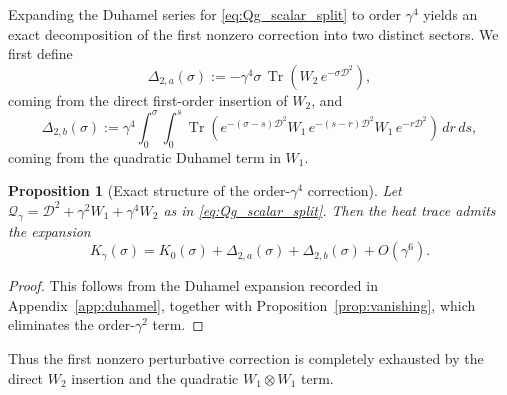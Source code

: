 \documentclass[11pt,a4paper]{article}
\numberwithin{equation}{section}
\newtheorem{Proposition}[Theorem]{Proposition}
\theoremstyle{definition}
\newcommand{\cD}{\mathcal{D}}
\newcommand{\Qg}{\mathcal{Q}_\gamma}
\newcommand{\Tr}{\operatorname{Tr}}
\begin{document}
Expanding the Duhamel series for \eqref{eq:Qg_scalar_split} to order
$\gamma^4$ yields an exact decomposition of the first nonzero correction
into two distinct sectors. We first define
\begin{equation}
\Delta_{2,a}(\sigma):=-\gamma^4\sigma\,\Tr(W_2\,e^{-\sigma\cD^2}),
\label{eq:Delta2a_def}
\end{equation}
coming from the direct first-order insertion of $W_2$, and
\begin{equation}
\Delta_{2,b}(\sigma):=\gamma^4\!\int_0^\sigma\!\!\int_0^s
\Tr\!\left(e^{-(\sigma-s)\cD^2}W_1\,e^{-(s-r)\cD^2}W_1\,e^{-r\cD^2}
\right)\,dr\,ds,
\label{eq:Delta2b_def}
\end{equation}
coming from the quadratic Duhamel term in $W_1$.

\begin{Proposition}[Exact structure of the order-$\gamma^4$ correction]
\label{prop:gamma4structure}
Let $\Qg=\cD^2+\gamma^2W_1+\gamma^4W_2$ as in \eqref{eq:Qg_scalar_split}.
Then the heat trace admits the expansion
\begin{equation}
K_\gamma(\sigma)=K_0(\sigma)+\Delta_{2,a}(\sigma)+\Delta_{2,b}(\sigma)
+O(\gamma^6).
\label{eq:Kgamma_gamma4}
\end{equation}
\end{Proposition}

\begin{proof}
This follows from the Duhamel expansion recorded in
Appendix~\ref{app:duhamel}, together with Proposition~\ref{prop:vanishing},
which eliminates the order-$\gamma^2$ term.
\end{proof}

Thus the first nonzero perturbative correction is completely exhausted by
the direct $W_2$ insertion and the quadratic $W_1\otimes W_1$ term.
\end{document}
